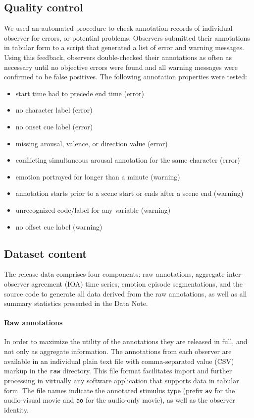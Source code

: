 \documentclass[10pt,a4paper,twocolumn]{article}
\begin{document}
\subsection*{Quality control}

We used an automated procedure to check annotation records of individual
observer for errors, or potential problems. Observers submitted their
annotations in tabular form to a script that generated a list of error and
warning messages. Using this feedback, observers double-checked their
annotations as often as necessary until no objective errors were found and all
warning messages were confirmed to be false positives. The following annotation
properties were tested:

\begin{itemize}
  \item start time had to precede end time (error)
  \item no character label (error)
  \item no onset cue label (error)
  \item missing arousal, valence, or direction value (error)
  \item conflicting simultaneous arousal annotation for the same character (error)
  \item emotion portrayed for longer than a minute (warning)
  \item annotation starts prior to a scene start or ends after a scene end
    (warning)
  \item unrecognized code/label for any variable (warning)
  \item no offset cue label (warning)
\end{itemize}

\subsection*{Dataset content}

The release data comprises four components: raw annotations, aggregate
inter-observer agreement (IOA) time series, emotion episode segmentations, and
the source code to generate all data derived from the raw annotations, as well
as all summary statistics presented in the Data Note.

\paragraph{Raw annotations} In order to maximize the utility of the annotations
they are released in full, and not only as aggregate information. The
annotations from each observer are available in an individual plain text file
with comma-separated value (CSV) markup in the \texttt{raw} directory. This
file format facilitates import and further processing in virtually any software
application that supports data in tabular form. The file names indicate the
annotated stimulus type (prefix \texttt{av} for the audio-visual movie and
\texttt{ao} for the audio-only movie), as well as the observer identity.
\end{document}
